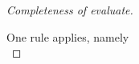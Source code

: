 \begin{proof}[Completeness of evaluate]
{    }

    {  One rule applies, namely \\

    }
\end{proof}
